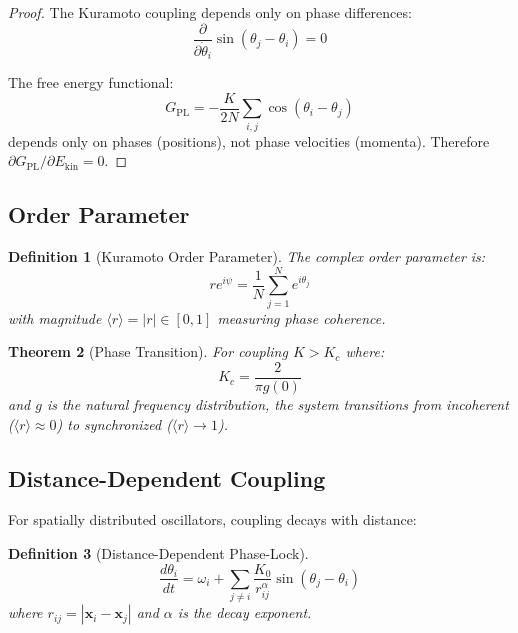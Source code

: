 \documentclass[twocolumn,amsmath,amssymb,aps,prl,superscriptaddress]{revtex4-2}
\newtheorem{theorem}{Theorem}[section]
\newtheorem{definition}[theorem]{Definition}
\newcommand{\Gfree}{G_{\text{PL}}}
\newcommand{\Ekin}{E_{\text{kin}}}
\newcommand{\orderp}{\langle r \rangle}
\begin{document}
\begin{proof}
The Kuramoto coupling depends only on phase differences:
\begin{equation}
\frac{\partial}{\partial \dot{\theta}_i} \sin(\theta_j - \theta_i) = 0
\end{equation}

The free energy functional:
\begin{equation}
\Gfree = -\frac{K}{2N} \sum_{i,j} \cos(\theta_i - \theta_j)
\end{equation}
depends only on phases (positions), not phase velocities (momenta). Therefore $\partial \Gfree / \partial \Ekin = 0$.
\end{proof}

\subsection{Order Parameter}

\begin{definition}[Kuramoto Order Parameter]
The complex order parameter is:
\begin{equation}
r e^{i\psi} = \frac{1}{N} \sum_{j=1}^{N} e^{i\theta_j}
\end{equation}
with magnitude $\orderp = |r| \in [0, 1]$ measuring phase coherence.
\end{definition}

\begin{theorem}[Phase Transition]
\label{thm:transition}
For coupling $K > K_c$ where:
\begin{equation}
K_c = \frac{2}{\pi g(0)}
\end{equation}
and $g$ is the natural frequency distribution, the system transitions from incoherent ($\orderp \approx 0$) to synchronized ($\orderp \to 1$).
\end{theorem}

\subsection{Distance-Dependent Coupling}

For spatially distributed oscillators, coupling decays with distance:

\begin{definition}[Distance-Dependent Phase-Lock]
\begin{equation}
\frac{d\theta_i}{dt} = \omega_i + \sum_{j \neq i} \frac{K_0}{r_{ij}^{\alpha}} \sin(\theta_j - \theta_i)
\end{equation}
where $r_{ij} = |\mathbf{x}_i - \mathbf{x}_j|$ and $\alpha$ is the decay exponent.
\end{definition}
\end{document}
